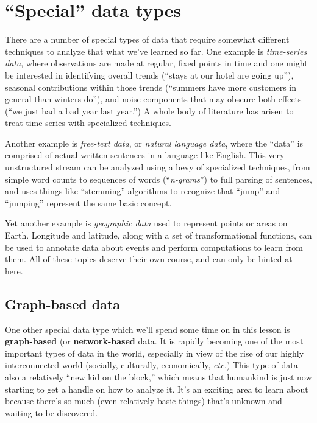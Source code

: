 
\chapter{``Special'' data types}

There are a number of special types of data that require somewhat different 
techniques to analyze that what we've learned so far. One example is
\textit{time-series data}, where observations are made at regular, fixed
points in time and one might be interested in identifying overall trends
(``stays at our hotel are going up''), seasonal contributions within those
trends (``summers have more customers in general than winters do''), and noise
components that may obscure both effects (``we just had a bad year last
year.'') A whole body of literature has arisen to treat time series with
specialized techniques.

Another example is \textit{free-text data}, or \textit{natural language data},
where the ``data'' is comprised of actual written sentences in a language like
English. This very unstructured stream can be analyzed using a bevy of
specialized techniques, from simple word counts to sequences of words
(``\textit{n-grams}'') to full parsing of sentences, and uses things like
``stemming'' algorithms to recognize that ``jump'' and ``jumping'' represent the
same basic concept.

Yet another example is \textit{geographic data} used to represent points or
areas on Earth. Longitude and latitude, along with a set of transformational
functions, can be used to annotate data about events and perform computations
to learn from them. All of these topics deserve their own course, and can only
be hinted at here.

\section{Graph-based data}

One other special data type which we'll spend some time on in this lesson is
\textbf{graph-based} (or \textbf{network-based} data. It is rapidly becoming
one of the most important types of data in the world, especially in view of
the rise of our highly interconnected world (socially, culturally,
economically, \textit{etc.}) This type of data also a relatively ``new kid on
the block,'' which means that humankind is just now starting to get a handle on
how to analyze it. It's an exciting area to learn about because there's so
much (even relatively basic things) that's unknown and waiting to be
discovered.

